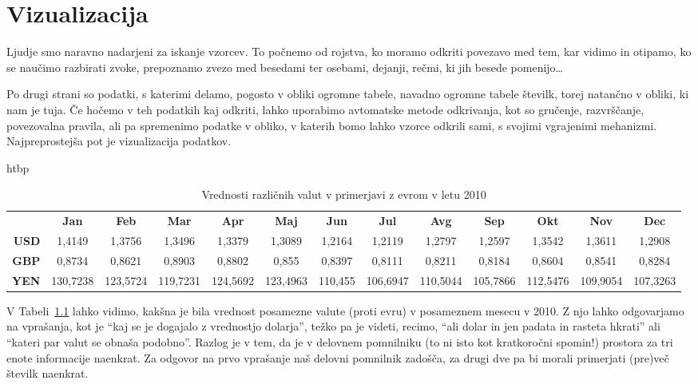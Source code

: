 ﻿\chapter{Vizualizacija}

Ljudje smo naravno nadarjeni za iskanje vzorcev. To počnemo od rojstva, ko moramo odkriti povezavo med tem, kar vidimo in otipamo, ko se naučimo razbirati zvoke, prepoznamo zvezo med besedami ter osebami, dejanji, rečmi, ki jih besede pomenijo\ldots

Po drugi strani so podatki, s katerimi delamo, pogosto v obliki ogromne tabele, navadno ogromne tabele številk, torej natančno v obliki, ki nam je tuja. Če hočemo v teh podatkih kaj odkriti, lahko uporabimo avtomatske metode odkrivanja, kot so gručenje, razvrščanje, povezovalna pravila, ali pa spremenimo podatke v obliko, v katerih bomo lahko vzorce odkrili sami, s svojimi vgrajenimi mehanizmi. Najpreprostejša pot je vizualizacija podatkov.

\begin{table}{htbp}
\begin{tabular}{rcccccccccccc}
& {\bf Jan} & {\bf Feb} & {\bf Mar} & {\bf Apr} & {\bf Maj} & {\bf Jun} & {\bf Jul} & {\bf Avg} & {\bf Sep} & {\bf Okt} & {\bf Nov} & {\bf Dec} \\
{\bf USD} & 1,4149 & 1,3756 & 1,3496 & 1,3379 & 1,3089 & 1,2164 & 1,2119 & 1,2797 & 1,2597 & 1,3542 & 1,3611 & 1,2908 \\
{\bf GBP} & 0,8734 & 0,8621 & 0,8903 & 0,8802 & 0,855 & 0,8397 & 0,8111 & 0,8211 & 0,8184 & 0,8604 & 0,8541 & 0,8284 \\
{\bf YEN} & 130,7238 & 123,5724 & 119,7231 & 124,5692 & 123,4963 & 110,455 & 106,6947 & 110,5044 & 105,7866 & 112,5476 & 109,9054 & 107,3263
\end{tabular}
\caption{Vrednosti različnih valut v primerjavi z evrom v letu 2010}
\label{t-valute}
\end{table}

V Tabeli~\ref{t-valute} lahko vidimo, kakšna je bila vrednost posamezne valute (proti evru) v posameznem mesecu v 2010. Z njo lahko odgovarjamo na vprašanja, kot je ``kaj se je dogajalo z vrednostjo dolarja'', težko pa je videti, recimo, ``ali dolar in jen
padata in rasteta hkrati'' ali ``kateri par valut se obnaša podobno”.
Razlog je v tem, da je v delovnem pomnilniku (to ni isto kot kratkoročni spomin!) prostora za tri enote informacije naenkrat. Za odgovor na prvo vprašanje naš delovni pomnilnik
zadošča, za drugi dve pa bi morali primerjati (pre)več številk naenkrat.

